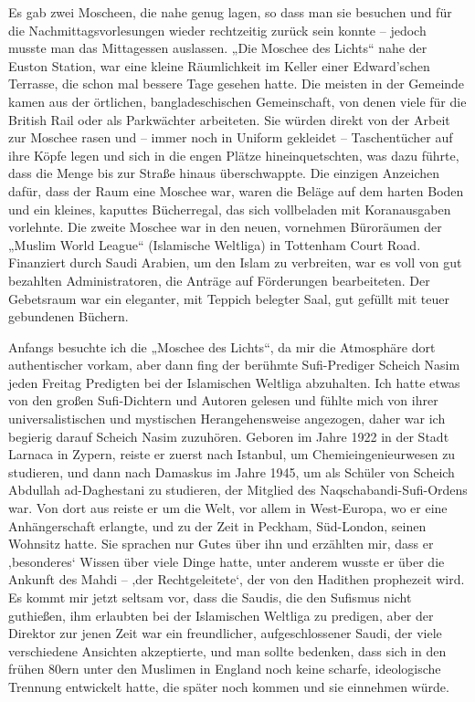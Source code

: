 \documentclass[12pt]{memoir}
\def\–{\hskip0pt-\hskip0pt}
\begin{document}
Es gab zwei Moscheen, die nahe genug lagen, so dass man sie besuchen
und für die Nachmittagsvorlesungen wieder rechtzeitig zurück sein konnte
– jedoch musste man das Mittagessen auslassen.
„Die Moschee des Lichts“ nahe der Euston Station,
war eine kleine Räumlichkeit im Keller einer Edward’schen Terrasse,
die schon mal bessere Tage gesehen hatte.
Die meisten in der Gemeinde kamen aus der örtlichen,
bangladeschischen Gemeinschaft,
von denen viele für die British Rail oder als Parkwächter arbeiteten.
Sie würden direkt von der Arbeit zur Moschee rasen und –
immer noch in Uniform gekleidet – Taschentücher auf ihre Köpfe legen
und sich in die engen Plätze hineinquetschten, was dazu führte,
dass die Menge bis zur Straße hinaus überschwappte.
Die einzigen Anzeichen dafür, dass der Raum eine Moschee war,
waren die Beläge auf dem harten Boden und ein kleines, kaputtes Bücherregal,
das sich vollbeladen mit Koranausgaben vorlehnte.
Die zweite Moschee war in den neuen,
vornehmen Büroräumen der „Muslim World League“ (Islamische Weltliga)
in Tottenham Court Road.
Finanziert durch Saudi Arabien, um den Islam zu verbreiten,
war es voll von gut bezahlten Administratoren,
die Anträge auf Förderungen bearbeiteten.
Der Gebetsraum war ein eleganter, mit Teppich belegter Saal,
gut gefüllt mit teuer gebundenen Büchern.

Anfangs besuchte ich die „Moschee des Lichts“,
da mir die Atmosphäre dort authentischer vorkam,
aber dann fing der berühmte Sufi-Prediger Scheich Nasim
jeden Freitag Predigten bei der Islamischen Weltliga abzuhalten.
Ich hatte etwas von den großen Sufi-Dichtern und Autoren gelesen
und fühlte mich von ihrer universalistischen
und mystischen Herangehensweise angezogen,
daher war ich begierig darauf Scheich Nasim zuzuhören.
Geboren im Jahre 1922 in der Stadt Larnaca in Zypern,
reiste er zuerst nach Istanbul, um Chemieingenieurwesen zu studieren,
und dann nach Damaskus im Jahre 1945,
um als Schüler von Scheich Abdullah ad\–Daghestani zu studieren,
der Mitglied des Naqschabandi-Sufi-Ordens war.
Von dort aus reiste er um die Welt, vor allem in West-Europa,
wo er eine Anhängerschaft erlangte, und zu der Zeit in Peckham,
Süd-London, seinen Wohnsitz hatte.
Sie sprachen nur Gutes über ihn und erzählten mir,
dass er ‚besonderes‘ Wissen über viele Dinge hatte,
unter anderem wusste er über die Ankunft des Mahdi –
‚der Rechtgeleitete‘, der von den Hadithen prophezeit wird.
Es kommt mir jetzt seltsam vor, dass die Saudis,
die den Sufismus nicht guthießen,
ihm erlaubten bei der Islamischen Weltliga zu predigen,
aber der Direktor zur jenen Zeit war ein freundlicher,
aufgeschlossener Saudi, der viele verschiedene Ansichten akzeptierte,
und man sollte bedenken, dass sich in den frühen 80ern
unter den Muslimen in England noch keine scharfe,
ideologische Trennung entwickelt hatte,
die später noch kommen und sie einnehmen würde.
\end{document}
